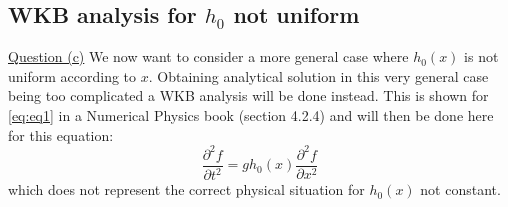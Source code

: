 \subsection{WKB analysis for $h_0$ not uniform}
\underline{Question (c)}
We now want to consider a more general case where $h_0(x)$ is not uniform according to $x$. Obtaining analytical solution in this very general case being too complicated a WKB analysis will be done instead. This is shown for \autoref{eq:eq1} in a Numerical Physics book \cite{physnumbook} (section 4.2.4) and will then be done here for this equation:
\begin{equation}
    \frac{\partial^2 f}{\partial t^2} = g h_0(x) \frac{\partial^2 f}{\partial x^2}
    \label{eq:eq2}
\end{equation}
which does not represent the correct physical situation for $h_0(x)$ not constant.

